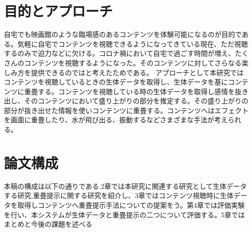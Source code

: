 \section{目的とアプローチ}
自宅でも映画館のような臨場感のあるコンテンツを体験可能になるのが目的である。気軽に自宅でコンテンツを視聴できるようになってきている現在、ただ視聴するのみで迫力などに欠ける。コロナ禍において自宅で過ごす時間が増え、たくさんのコンテンツを視聴するようになった。そのコンテンツに対してさらなる楽しみ方を提供できるのではと考えたためである。
アプローチとして本研究ではコンテンツを視聴しているときの生体データを取得し、生体データを基にコンテンツに重畳する。コンテンツを視聴している時の生体データを取得し感情を抜き出し、そのコンテンツにおいて盛り上がりの部分を推定する。その盛り上がりの部分が抜き出せた情報を使いコンテンツに重畳する。コンテンツへはエフェクトを画面に重畳したり、水が飛び出る、振動するなどさまざまな手法が考えられる。

\label{sec:example}


\section{論文構成}
本稿の構成は以下の通りである.2章では本研究に関連する研究として生体データする研究,重畳提示に関する研究を紹介し、3章ではコンテンツ視聴時に生体データを取得しコンテンツへ重畳提示手法についての提案をう。第4章では評価実験を行い、本システムが生体データと重畳提示の二つについて評価する。5章ではまとめと今後の課題を述べる

